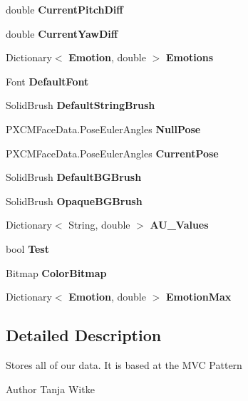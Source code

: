 \begin{DoxyCompactItemize}
double \textbf{ Current\+Pitch\+Diff}\hspace{0.3cm}{\ttfamily  [get, set]}
\item 
double \textbf{ Current\+Yaw\+Diff}\hspace{0.3cm}{\ttfamily  [get, set]}
\item 
Dictionary$<$ \textbf{ Emotion}, double $>$ \textbf{ Emotions}\hspace{0.3cm}{\ttfamily  [get, set]}
\item 
Font \textbf{ Default\+Font}\hspace{0.3cm}{\ttfamily  [get, set]}
\item 
Solid\+Brush \textbf{ Default\+String\+Brush}\hspace{0.3cm}{\ttfamily  [get, set]}
\item 
P\+X\+C\+M\+Face\+Data.\+Pose\+Euler\+Angles \textbf{ Null\+Pose}\hspace{0.3cm}{\ttfamily  [get, set]}
\item 
P\+X\+C\+M\+Face\+Data.\+Pose\+Euler\+Angles \textbf{ Current\+Pose}\hspace{0.3cm}{\ttfamily  [get, set]}
\item 
Solid\+Brush \textbf{ Default\+B\+G\+Brush}\hspace{0.3cm}{\ttfamily  [get]}
\item 
Solid\+Brush \textbf{ Opaque\+B\+G\+Brush}\hspace{0.3cm}{\ttfamily  [get]}
\item 
Dictionary$<$ String, double $>$ \textbf{ A\+U\+\_\+\+Values}\hspace{0.3cm}{\ttfamily  [get, set]}
\item 
bool \textbf{ Test}\hspace{0.3cm}{\ttfamily  [get, set]}
\item 
Bitmap \textbf{ Color\+Bitmap}\hspace{0.3cm}{\ttfamily  [get]}
\item 
Dictionary$<$ \textbf{ Emotion}, double $>$ \textbf{ Emotion\+Max}\hspace{0.3cm}{\ttfamily  [get, set]}
\end{DoxyCompactItemize}


\subsection{Detailed Description}
Stores all of our data. It is based at the M\+VC Pattern

\begin{DoxyAuthor}{Author}
Tanja Witke 
\end{DoxyAuthor}


